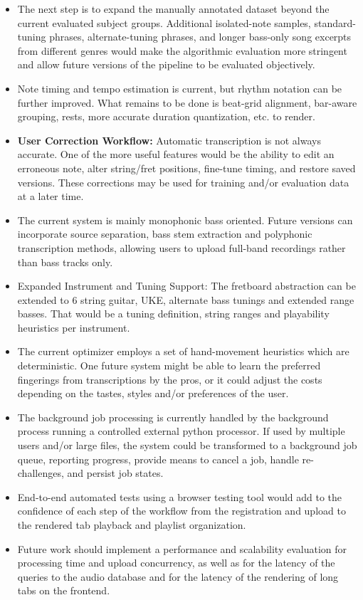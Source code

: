 \documentclass[a4paper, 12pt, titlepage]{article}
\begin{document}
\begin{itemize}
    \item The next step is to expand the manually annotated dataset beyond the current evaluated subject groups. Additional isolated-note samples, standard-tuning phrases, alternate-tuning phrases, and longer bass-only song excerpts from different genres would make the algorithmic evaluation more stringent and allow future versions of the pipeline to be evaluated objectively.
    \item Note timing and tempo estimation is current, but rhythm notation can be further improved. What remains to be done is beat-grid alignment, bar-aware grouping, rests, more accurate duration quantization, etc. to render.
    \item \textbf{User Correction Workflow:} Automatic transcription is not always accurate. One of the more useful features would be the ability to edit an erroneous note, alter string/fret positions, fine-tune timing, and restore saved versions. These corrections may be used for training and/or evaluation data at a later time.
    \item The current system is mainly monophonic bass oriented. Future versions can incorporate source separation, bass stem extraction and polyphonic transcription methods, allowing users to upload full-band recordings rather than bass tracks only.
    \item Expanded Instrument and Tuning Support: The fretboard abstraction can be extended to 6 string guitar, UKE, alternate bass tunings and extended range basses. That would be a tuning definition, string ranges and playability heuristics per instrument.
    \item The current optimizer employs a set of hand-movement heuristics which are deterministic. One future system might be able to learn the preferred fingerings from transcriptions by the pros, or it could adjust the costs depending on the tastes, styles and/or preferences of the user.
    \item The background job processing is currently handled by the background process running a controlled external python processor. If used by multiple users and/or large files, the system could be transformed to a background job queue, reporting progress, provide means to cancel a job, handle re-challenges, and persist job states.
    \item End-to-end automated tests using a browser testing tool would add to the confidence of each step of the workflow from the registration and upload to the rendered tab playback and playlist organization.
    \item Future work should implement a performance and scalability evaluation for processing time and upload concurrency, as well as for the latency of the queries to the audio database and for the latency of the rendering of long tabs on the frontend.
\end{itemize}
\end{document}
